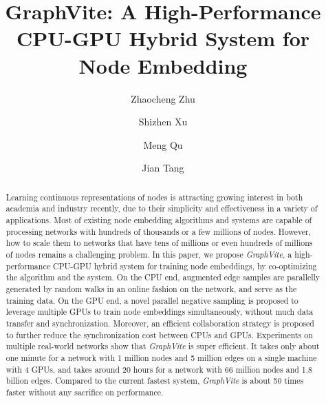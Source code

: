 \documentclass[sigconf]{acmart}
\newcommand{\Graphy}{\textit{GraphVite}\xspace}
\begin{document}
\title{GraphVite: A High-Performance CPU-GPU Hybrid System for Node Embedding}

\setlength{\belowcaptionskip}{-0.01pt}


\author{Zhaocheng Zhu}

\author{Shizhen Xu}

\author{Meng Qu}

\author{Jian Tang}

\renewcommand{\shortauthors}{Zhu et al.}

\begin{abstract}

Learning continuous representations of nodes is attracting growing interest in both academia and industry recently, due to their simplicity and effectiveness in a variety of applications. Most of existing node embedding algorithms and systems are capable of processing networks with hundreds of thousands or a few millions of nodes. However, how to scale them to networks that have tens of millions or even hundreds of millions of nodes remains a challenging problem. In this paper, we propose \Graphy, a high-performance CPU-GPU hybrid system for training node embeddings, by co-optimizing the algorithm and the system. On the CPU end, augmented edge samples are parallelly generated by random walks in an online fashion on the network, and serve as the training data. On the GPU end, a novel parallel negative sampling is proposed to leverage multiple GPUs to train node embeddings simultaneously, without much data transfer and synchronization. Moreover, an efficient collaboration strategy is proposed to further reduce the synchronization cost between CPUs and GPUs. Experiments on multiple real-world networks show that \Graphy is super efficient. It takes only about one minute for a network with 1 million nodes and 5 million edges on a single machine with 4 GPUs, and takes around 20 hours for a network with 66 million nodes and 1.8 billion edges. Compared to the current fastest system, \Graphy is about 50 times faster without any sacrifice on performance.

\end{abstract}
\end{document}
